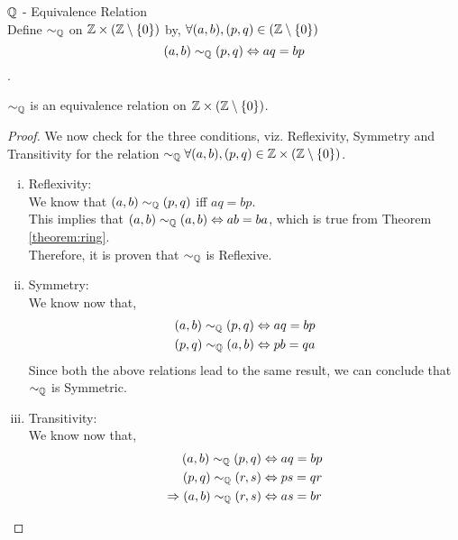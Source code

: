 \documentclass[11pt]{scrartcl}
\begin{document}
 \begin{definition}
 	$\mathbb Q$ - Equivalence Relation\\
 	Define $\sim_{\mathbb Q}$ on $\mathbb Z \times \left(\mathbb Z \setminus \{0\}\right)$ by, $\forall (a,b),(p,q) \in (\mathbb Z \setminus \{ 0 \} )$
 	$$(a,b) \sim_{\mathbb Q} (p,q) \Leftrightarrow aq = bp$$.
 \end{definition}

\begin{lemma}
	$\sim_{\mathbb Q}$ is an equivalence relation on $\mathbb Z \times (\mathbb Z \setminus \{0\})$.
\end{lemma}

\begin{proof}
	We now check for the three conditions, viz. Reflexivity, Symmetry and Transitivity for the relation $\sim_{\mathbb Q} \forall (a,b),(p,q) \in \mathbb Z \times (\mathbb Z \setminus \{0\})$.
	\begin{enumerate}[(i)]
		\item Reflexivity:\\
		 We know that $(a,b) \sim_{\mathbb Q} (p,q)$ iff $aq=bp$.\\
		 This implies that $(a,b)\sim_{\mathbb Q}(a,b) \Leftrightarrow ab=ba$, which is true from Theorem \ref{theorem:ring}.\\
		 Therefore, it is proven that $\sim_{\mathbb Q}$ is Reflexive.
		 
		 \item Symmetry:\\
		 We know now that,
		 \begin{align*}
		 	(a,b) \sim_{\mathbb Q} (p,q) \Leftrightarrow aq=bp \\
		 	(p,q) \sim_{\mathbb Q} (a,b) \Leftrightarrow pb=qa
		 \end{align*}
	 	Since both the above relations lead to the same result, we can conclude that $\sim_{\mathbb Q}$ is Symmetric.
	 	
	 	\item Transitivity:\\
	 	We know now that,
	 	\begin{align*}
	 		(a,b) \sim_{\mathbb Q} (p,q) &\Leftrightarrow aq=bp \\
	 		(p,q) \sim_{\mathbb Q} (r,s) &\Leftrightarrow ps=qr \\
	 		\Rightarrow (a,b) \sim_{\mathbb Q} (r,s) &\Leftrightarrow as=br
	 	\end{align*}
	\end{enumerate}
\end{proof}
\end{document}
